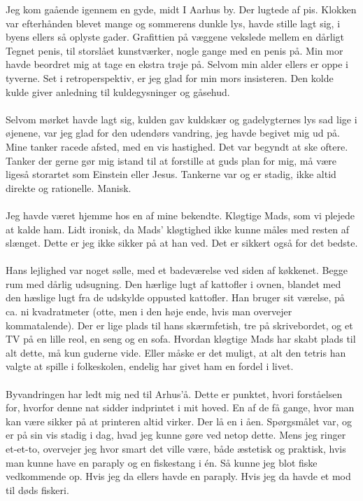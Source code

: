 \documentclass[]{article}
\begin{document}
Jeg kom gaående igennem en gyde, midt I Aarhus by. Der lugtede af pis. Klokken var efterhånden blevet mange og sommerens dunkle lys, havde stille lagt sig, i byens ellers så oplyste gader. Grafittien på væggene vekslede mellem en dårligt Tegnet penis, til storslået kunstværker, nogle gange med en penis på. Min mor havde beordret mig at tage en ekstra trøje på. Selvom min alder ellers er oppe i tyverne. Set i retroperspektiv, er jeg glad for min mors insisteren. Den kolde kulde giver anledning til kuldegysninger og gåsehud.
\\ \\
Selvom mørket havde lagt sig, kulden gav kuldskær og gadelygternes lys sad lige i øjenene, var jeg glad for den udendørs vandring, jeg havde begivet mig ud på. Mine tanker racede afsted, med en vis hastighed. Det var begyndt at ske oftere. Tanker der gerne gør mig istand til at forstille at guds plan for mig, må være ligeså storartet som Einstein eller Jesus. Tankerne var og er stadig, ikke altid direkte og rationelle. Manisk.
\\ \\
Jeg havde været hjemme hos en af mine bekendte. Kløgtige Mads, som
vi plejede at kalde ham. Lidt ironisk, da Mads’ kløgtighed ikke kunne måles med resten af slænget. Dette er jeg ikke sikker på at han ved. Det er sikkert også for det bedste.
\\ \\
Hans lejlighed var noget sølle, med et badeværelse ved siden af køkkenet. Begge rum med dårlig udsugning. Den hærlige lugt af kattofler i ovnen, blandet med den hæslige lugt fra de udskylde oppusted kattofler. Han bruger sit værelse, på ca. ni kvadratmeter (otte, men i den høje ende, hvis man overvejer kommatalende). Der er lige plads til hans skærmfetish, tre på skrivebordet, og et TV på en lille reol, en seng og en sofa. Hvordan kløgtige Mads har
skabt plads til alt dette, må kun guderne vide. Eller måske er det muligt, at alt den tetris han valgte at spille i folkeskolen, endelig har givet ham en fordel i livet.
\\ \\
Byvandringen har ledt mig ned til Arhus’å. Dette er punktet, hvori forståelsen for, hvorfor denne nat sidder indprintet i mit hoved. En af de få gange, hvor man kan være sikker på at printeren altid virker. Der lå en i åen. Spørgsmålet var, og er på sin vis stadig i dag, hvad jeg kunne gøre ved netop dette. Mens
jeg ringer et-et-to, overvejer jeg hvor smart det ville være, både æstetisk og praktisk, hvis man kunne have en paraply og en fiskestang i én. Så kunne jeg blot fiske vedkommende op. Hvis jeg da ellers havde en paraply. Hvis jeg da havde et mod til døds fiskeri.
\end{document}

